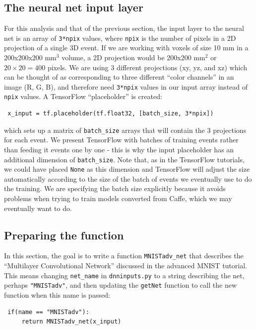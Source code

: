 \documentclass[10pt]{article}
\begin{document}
\subsection{The neural net input layer}\label{ss_nninput}
\noindent For this analysis and that of the previous section, the input layer to the neural net is an array of \verb|3*npix| values, where \verb|npix| is the number of pixels in a 2D 
projection of a single 3D event.  If we are working with voxels of size 10 mm in a 200x200x200 mm$^3$ volume, a 2D projection would be 200x200 mm$^2$ or $20 \times 20 = 400$
pixels.  We are using 3 different projections (xy, yz, and xz) which can be thought of as corresponding to three different ``color channels'' in an image (R, G, B), and therefore need 
\verb|3*npix| values in our input array instead of \verb|npix| values.  A TensorFlow ``placeholder'' is created:

\begin{verbatim}
 x_input = tf.placeholder(tf.float32, [batch_size, 3*npix])
\end{verbatim}

\noindent which sets up a matrix of \verb|batch_size| arrays that will contain the 3 projections for each event.  We present TensorFlow with batches of training events rather than feeding it events one by one - this is why the input placeholder has an additional dimension of \verb|batch_size|.  Note that, as in the TensorFlow tutorials, we could have placed \verb|None| as this dimension and 
TensorFlow will adjust the size automatically according to the size of the batch of events we eventually use to do the training.  We are specifying the batch size explicitly because it avoids problems 
when trying to train models converted from Caffe, which we may eventually want to do.

\subsection{Preparing the function}
\noindent In this section, the goal is to write a function \verb|MNISTadv_net| that describes the ``Multilayer Convolutional Network'' 
discussed in the advanced MNIST tutorial.  This means changing \verb|net_name| in \verb|dnninputs.py| to a string describing the net, perhaps \verb|"MNISTadv"|, and then updating the \verb|getNet| function to call the new function when this name is passed:

\begin{verbatim}
 if(name == "MNISTadv"):
     return MNISTadv_net(x_input)
\end{verbatim}
\end{document}
